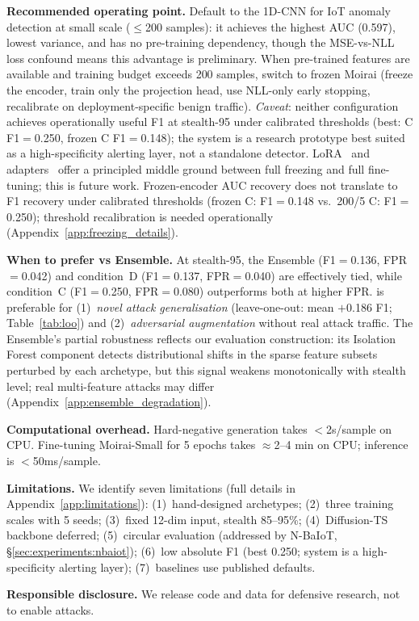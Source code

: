 \textbf{Recommended operating point.}
Default to the 1D-CNN for IoT anomaly detection at small scale
($\leq$200 samples): it achieves the highest AUC (0.597), lowest variance,
and has no pre-training dependency, though the MSE-vs-NLL loss confound
means this advantage is preliminary.
When pre-trained features are available and training budget exceeds
200 samples, switch to frozen Moirai (freeze the encoder, train only
the projection head, use NLL-only early stopping, recalibrate on
deployment-specific benign traffic).
\emph{Caveat}: neither configuration achieves operationally useful F1 at
stealth-95 under calibrated thresholds (best: C F1$=$0.250,
frozen C F1$=$0.148); the system is a research prototype best suited as
a high-specificity alerting layer, not a standalone detector.
LoRA~\cite{hu2022lora} and adapters~\cite{houlsby2019adapters} offer
a principled middle ground between full freezing and full fine-tuning;
this is future work.
Frozen-encoder AUC recovery does not translate to F1 recovery under
calibrated thresholds (frozen C: F1$=$0.148 vs.\ 200/5 C: F1$=$0.250);
threshold recalibration is needed operationally
(Appendix~\ref{app:freezing_details}).

\textbf{When to prefer \ours{} vs Ensemble.}
At stealth-95, the Ensemble (F1$=$0.136, FPR$=$0.042) and condition~D
(F1$=$0.137, FPR$=$0.040) are effectively tied, while condition~C
(F1$=$0.250, FPR$=$0.080) outperforms both at higher FPR.
\ours{} is preferable for
(1)~\emph{novel attack generalisation} (leave-one-out: mean $+$0.186 F1;
Table~\ref{tab:loo}) and
(2)~\emph{adversarial augmentation} without real attack traffic.
The Ensemble's partial robustness reflects our evaluation construction: its Isolation Forest component detects distributional shifts in the sparse feature subsets perturbed by each archetype, but this signal weakens monotonically with stealth level; real multi-feature attacks may differ (Appendix~\ref{app:ensemble_degradation}).

\textbf{Computational overhead.}
Hard-negative generation takes $<$2s/sample on CPU.
Fine-tuning Moirai-Small for 5 epochs takes $\approx$2--4 min on CPU;
inference is $<$50ms/sample.

\textbf{Limitations.}
We identify seven limitations (full details in Appendix~\ref{app:limitations}):
(1)~hand-designed archetypes;
(2)~three training scales with 5 seeds;
(3)~fixed 12-dim input, stealth 85--95\%;
(4)~Diffusion-TS backbone deferred;
(5)~circular evaluation (addressed by N-BaIoT, \S\ref{sec:experiments:nbaiot});
(6)~low absolute F1 (best 0.250; system is a high-specificity alerting layer);
(7)~baselines use published defaults.

\textbf{Responsible disclosure.}
We release code and data for defensive research, not to enable attacks.
